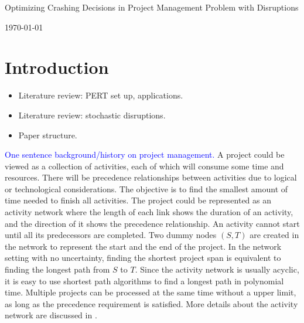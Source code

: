 \documentclass[11pt]{article}
\newcommand{\ms}{\medskip}
\begin{document}
\baselineskip0.25in

\begin{center}
\begin{large}
\begin{bf}

Optimizing Crashing Decisions in Project Management Problem with Disruptions \ms

\today \ms
\end{bf}
\end{large}
\end{center}

\section{Introduction} \label{sec:intro}
	\begin{itemize}
		\item Literature review: PERT set up, applications.
		\item Literature review: stochastic disruptions.
		\item Paper structure.
	\end{itemize}
	\textcolor{blue}{One sentence background/history on project management.} A project could be viewed as a collection of activities, each of which will consume some time and resources. There will be precedence relationships between activities due to logical or technological considerations. The objective is to find the smallest amount of time needed to finish all activities. The project could be represented as an activity network where the length of each link shows the duration of an activity, and the direction of it shows the precedence relationship. An activity cannot start until all its predecessors are completed. Two dummy nodes \((S,T)\) are created in the network to represent the start and the end of the project. In the network setting with no uncertainty, finding the shortest project span is equivalent to finding the longest path from \(S\) to \(T\). Since the activity network is usually acyclic, it is easy to use shortest path algorithms to find a longest path in polynomial time. Multiple projects can be processed at the same time without a upper limit, as long as the precedence requirement is satisfied. More details about the activity network are discussed in \cite{Elmaghraby77}.\\
	\newline 
\end{document}
